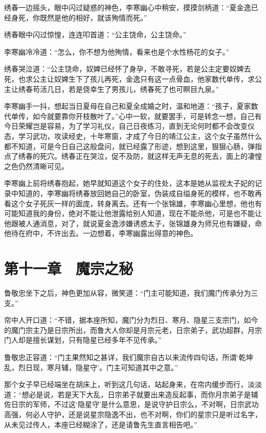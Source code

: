 绣春一边摇头，眼中闪过疑惑的神色，李寒幽心中稍安，摸摸剑柄道：“夏金逸已经身死，你既然是他的相好，就该殉情而死。”

绣春眼中闪过惊惶，连连叩首道：“公主饶命，公主饶命。”

李寒幽冷冷道：“怎么，你不想为他殉情，看来也是个水性杨花的女子。”

绣春哭泣道：“公主饶命，奴婢已经怀了身孕，不敢寻死，若是公主定要奴婢去死，也求公主让奴婢生下了孩儿再死，金逸只有这一点骨血，他家数代单传，求公主让绣春苟活几日，若是侥幸生了男孩儿，绣春死了也可瞑目九泉。”

李寒幽手一抖，想起当日夏母在自己和夏全成婚之时，温和地道：“孩子，夏家数代单传，如今就要靠你开枝散叶了。”心中一软，就要罢手，可是转念一想，自己有今日荣耀岂是容易，为了学习礼仪，自己日夜练习，直到无论何时都不会改变仪态，学习武功，攻读经史，十年寒窗，才成了今日的靖江公主，这个女子虽然什么都不知道，可是今日自己这般盘问，就已经露了形迹，想到这里，狠狠心肠，弹指点了绣春的死穴。绣春正在哭泣，促不及防，就这样无声无息的死去，面上的凄惶之色仍然清晰可见。

李寒幽上前将绣春抱起，她早就知道这个女子的住处，这本是她从监视太子妃的记录中知道的，李寒幽将绣春放回她自己的卧室，伪装成自缢身死的模样，也不敢再看这个女子死灰一样的面庞，转身离去。还有一个张锦雄，李寒幽心里想，他也有可能知道我的身份，绝对不能让他泄露给别人知道，现在不能杀他，可是也不能让他跟被人通消息，对了，就说夏金逸涉嫌诱惑太子，张锦雄身为师兄也有嫌疑，命他待在府中，不许出去。一边想着，李寒幽露出得意的神色。

\chapter{第十一章　魔宗之秘}

鲁敬忠坐下之后，神色更加从容，微笑道：“门主可能知道，我们魔门传承分为三支。”

帘中人开口道：“不错，据本座所知，魔门分为烈日、寒月、隐星三支宗门，如今的魔门宗主乃是日宗所出，而鲁大人你却是月宗元老，日宗弟子，武功超群，月宗门人却是擅长谋划，只有隐星已经多年不见传承。”

鲁敬忠正容道：“门主果然知之甚详，我们魔宗自古以来流传四句话，所谓‘乾坤乱，烈日现，寒月辅，隐星守’。门主可知道其中之意。”

那个女子早已经端坐在胡床上，听到这几句话，站起身来，在帘内缓步而行，淡淡道：“想必是说，若是天下大乱，日宗弟子就要出来造反起事，而你月宗弟子是辅佐日宗的军师，不过这‘隐星守’是什么意思，是说守护日宗么，不对啊，日宗武功高强，何必人守护，还是说星宗隐逸不出，也不对啊，你们的星宗只是听过名字，从未见过传人，本座已经糊涂了，还是请鲁先生直言相告吧。”

